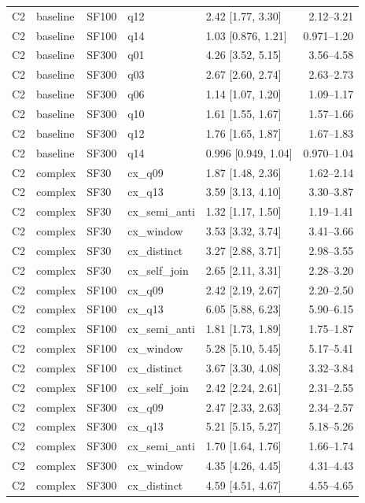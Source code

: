 \begin{longtable}{lllllr}
C2 & baseline & SF100 & q12 & 2.42 [1.77, 3.30] & 2.12--3.21 \\
C2 & baseline & SF100 & q14 & 1.03 [0.876, 1.21] & 0.971--1.20 \\
C2 & baseline & SF300 & q01 & 4.26 [3.52, 5.15] & 3.56--4.58 \\
C2 & baseline & SF300 & q03 & 2.67 [2.60, 2.74] & 2.63--2.73 \\
C2 & baseline & SF300 & q06 & 1.14 [1.07, 1.20] & 1.09--1.17 \\
C2 & baseline & SF300 & q10 & 1.61 [1.55, 1.67] & 1.57--1.66 \\
C2 & baseline & SF300 & q12 & 1.76 [1.65, 1.87] & 1.67--1.83 \\
C2 & baseline & SF300 & q14 & 0.996 [0.949, 1.04] & 0.970--1.04 \\
C2 & complex & SF30 & cx\_q09 & 1.87 [1.48, 2.36] & 1.62--2.14 \\
C2 & complex & SF30 & cx\_q13 & 3.59 [3.13, 4.10] & 3.30--3.87 \\
C2 & complex & SF30 & cx\_semi\_anti & 1.32 [1.17, 1.50] & 1.19--1.41 \\
C2 & complex & SF30 & cx\_window & 3.53 [3.32, 3.74] & 3.41--3.66 \\
C2 & complex & SF30 & cx\_distinct & 3.27 [2.88, 3.71] & 2.98--3.55 \\
C2 & complex & SF30 & cx\_self\_join & 2.65 [2.11, 3.31] & 2.28--3.20 \\
C2 & complex & SF100 & cx\_q09 & 2.42 [2.19, 2.67] & 2.20--2.50 \\
C2 & complex & SF100 & cx\_q13 & 6.05 [5.88, 6.23] & 5.90--6.15 \\
C2 & complex & SF100 & cx\_semi\_anti & 1.81 [1.73, 1.89] & 1.75--1.87 \\
C2 & complex & SF100 & cx\_window & 5.28 [5.10, 5.45] & 5.17--5.41 \\
C2 & complex & SF100 & cx\_distinct & 3.67 [3.30, 4.08] & 3.32--3.84 \\
C2 & complex & SF100 & cx\_self\_join & 2.42 [2.24, 2.61] & 2.31--2.55 \\
C2 & complex & SF300 & cx\_q09 & 2.47 [2.33, 2.63] & 2.34--2.57 \\
C2 & complex & SF300 & cx\_q13 & 5.21 [5.15, 5.27] & 5.18--5.26 \\
C2 & complex & SF300 & cx\_semi\_anti & 1.70 [1.64, 1.76] & 1.66--1.74 \\
C2 & complex & SF300 & cx\_window & 4.35 [4.26, 4.45] & 4.31--4.43 \\
C2 & complex & SF300 & cx\_distinct & 4.59 [4.51, 4.67] & 4.55--4.65 \\

\end{longtable}
